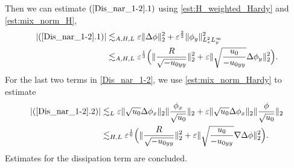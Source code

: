 \documentclass[reqno, 11pt]{amsart}
\theoremstyle{plain}
\theoremstyle{definition}
\theoremstyle{remark}
\numberwithin{equation}{section}
\begin{document}
Then we can estimate $(\ref{Dis_nar_1-2}.1)$ using \eqref{est:H_weighted_Hardy} and \eqref{est:mix_norm_H},
\begin{equation}\label{Dis_nar_1-2-2}
\begin{aligned}
|(\ref{Dis_nar_1-2}.1)| &\lesssim_{A,H,L} \varepsilon \|\Delta \phi\|_2^2 + \varepsilon^{\frac{2}{3}} \| \phi_y\|_{L^2_x L^\infty_y}^2\\
 &\lesssim_{A,H,L} \varepsilon^{\frac{1}{3}}  \Big( \|\frac{R}{\sqrt{-u_{0yy}}}\|_2^2 + \varepsilon \| \sqrt{\frac{u_0}{-u_{0yy}}} \Delta \phi_y\|_2^2\Big).
\end{aligned}
\end{equation}
For the last two terms in \eqref{Dis_nar_1-2}, we use \eqref{est:mix_norm_Hardy} to estimate
\begin{equation}\label{Dis_nar_1-2-3}
\begin{aligned}
|(\ref{Dis_nar_1-2}.2)| &\lesssim_L \varepsilon \| \sqrt{u_0} \Delta \phi_x \|_2 \| \frac{\phi_x}{\sqrt{u_0}}\|_2 + \varepsilon \| \sqrt{u_0} \Delta \phi_x \|_2 \| \frac{\phi}{\sqrt{u_0}}\|_2\\
&\lesssim_{H,L} \varepsilon^{\frac{1}{6}}  \Big( \|\frac{R}{\sqrt{-u_{0yy}}}\|_2^2 + \varepsilon \| \sqrt{\frac{u_0}{-u_{0yy}}} \nabla \Delta \phi\|_2^2\Big).
\end{aligned}
\end{equation}
Estimates for the dissipation term are concluded.
\end{document}
